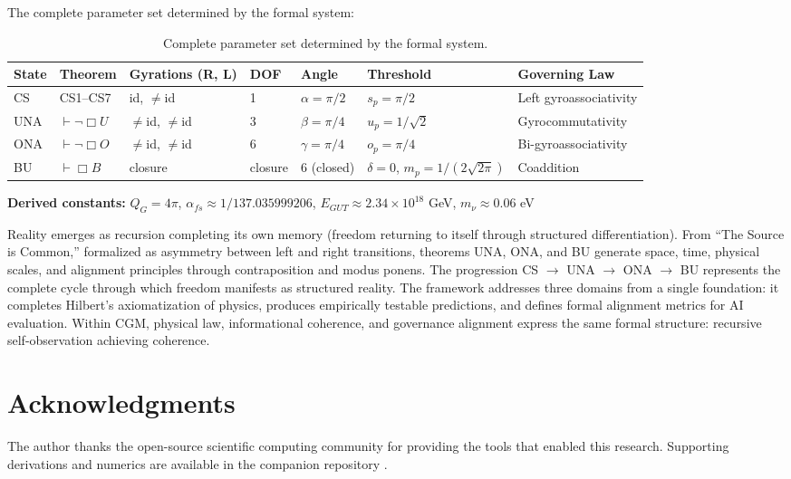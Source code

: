 \documentclass[11pt,a4paper]{article}
\theoremstyle{definition}
\theoremstyle{remark}
\begin{document}
The complete parameter set determined by the formal system:

\begin{table}[h]
\centering
\small
\begin{tabular}{lllllll}
\toprule
State & Theorem & Gyrations (R, L) & DOF & Angle & Threshold & Governing Law \\
\midrule
CS & CS1--CS7 & id, $\neq$id & 1 & $\alpha = \pi/2$ & $s_p = \pi/2$ & Left gyroassociativity \\
UNA & $\vdash \neg\Box U$ & $\neq$id, $\neq$id & 3 & $\beta = \pi/4$ & $u_p = 1/\sqrt{2}$ & Gyrocommutativity \\
ONA & $\vdash \neg\Box O$ & $\neq$id, $\neq$id & 6 & $\gamma = \pi/4$ & $o_p = \pi/4$ & Bi-gyroassociativity \\
BU & $\vdash \Box B$ & closure & closure & 6 (closed) & $\delta = 0$, $m_p = 1/(2\sqrt{2\pi})$ & Coaddition \\
\bottomrule
\end{tabular}
\caption{Complete parameter set determined by the formal system.}
\end{table}

\textbf{Derived constants:} $Q_G = 4\pi$, $\alpha_{fs} \approx 1/137.035999206$, $E_{GUT} \approx 2.34\times10^{18}$ GeV, $m_\nu \approx 0.06$ eV

Reality emerges as recursion completing its own memory (freedom returning to itself through structured differentiation). From ``The Source is Common,'' formalized as asymmetry between left and right transitions, theorems UNA, ONA, and BU generate space, time, physical scales, and alignment principles through contraposition and modus ponens. The progression CS $\to$ UNA $\to$ ONA $\to$ BU represents the complete cycle through which freedom manifests as structured reality. The framework addresses three domains from a single foundation: it completes Hilbert's axiomatization of physics, produces empirically testable predictions, and defines formal alignment metrics for AI evaluation. Within CGM, physical law, informational coherence, and governance alignment express the same formal structure: recursive self-observation achieving coherence.

\section*{Acknowledgments}

The author thanks the open-source scientific computing community for providing the tools that enabled this research. Supporting derivations and numerics are available in the companion repository \cite{cgm-repo}.
\end{document}
